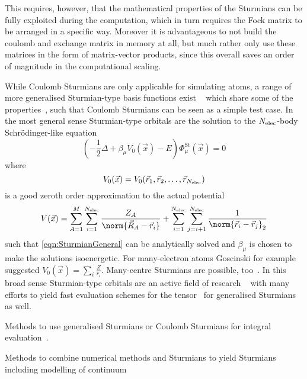 

This requires, however, that the mathematical properties of the Sturmians
can be fully exploited during the computation,
which in turn requires the Fock matrix to be arranged in a specific way.
Moreover it is advantageous to not build the coulomb and exchange matrix in memory at all,
but much rather only use these matrices in the form of matrix-vector products,
since this overall saves an order of magnitude in the computational scaling.


While Coulomb Sturmians are only applicable for simulating atoms,
a range of more generalised Sturmian-type basis functions exist
~\cite{Avery2011}
which share some of the properties~\cite{Avery2011},
such that Coulomb Sturmians can be seen as a simple test case.
In the most general sense Sturmian-type orbitals are the solution
to the $N_\text{elec}$-body Schrödinger-like equation
\begin{equation}
	\left( -\frac12 \Delta + \beta_{\mu} V_0(\vec{x}) - E \right) \Phi^\text{St}_\mu(\vec{x}) = 0
	\label{eqn:SturmianGeneral}
\end{equation}
where
\[ V_0(\vec{x}) = V_0(\vec{r}_1, \vec{r}_2, \ldots, \vec{r}_{N_\text{elec}}) \]
is a good zeroth order approximation to the actual potential
\[ V(\vec{x}) = \sum_{A=1}^M \sum_{i=1}^{\Nelec} \frac{Z_A}{\norm{\vec{R}_A - \vec{r}_i}}
+ \sum_{i=1}^{\Nelec} \sum_{j=i+1}^{\Nelec} \frac{1}{\norm{\vec{r}_i - \vec{r}_j}_2} \]
such that \eqref{eqn:SturmianGeneral} can be analytically solved
and $\beta_{\mu}$ is chosen to make the solutions isoenergetic.
For many-electron atoms Goscinski for example suggested
$V_0(\vec{x}) = \sum_i \frac{Z}{r_i}$.
Many-centre Sturmians are possible, too~\cite{Avery2003,Avery2013}.
In this broad sense Sturmian-type orbitals are an active
field of research%
~\cite{%
	Gruzdev1990,Avery2006,Hoggan2009,%
	Randazzo2010,Mitnik2011,%
	Avery2011,Avery2011PhD,%
	Avery2013,Avery2015,Randazzo2015,Granados2016,Abdouraman2016,%
	Morales2016,Avery2017,Avery2018%
}
with many efforts to yield fast evaluation schemes
for the \ERI tensor~\cite{Avery2013,Avery2017,Avery2018}
for generalised Sturmians as well.

Methods to use generalised Sturmians or Coulomb Sturmians
for \STO integral evaluation~\cite{Morales2016,Avery2017}.

Methods to combine numerical methods and Sturmians
to yield Sturmians including modelling of continuum%
~\cite{Randazzo2010,Mitnik2011,Randazzo2015,Granados2016,Abdouraman2016}
